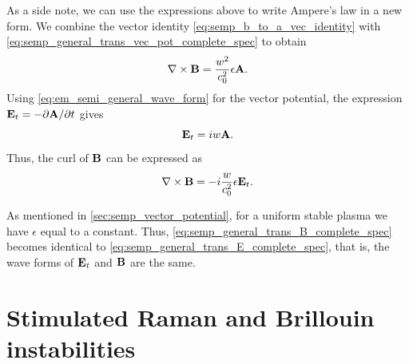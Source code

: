 \documentclass[a4paper,11pt]{report}
\begin{document}
As a side note, we can use the expressions above to write Ampere's law in a new form. We combine the vector identity \cref{eq:semp_b_to_a_vec_identity} with \cref{eq:semp_general_trans_vec_pot_complete_spec} to obtain
\begin{equation*}
    \nabla \times \mathbf{B} = \frac{w^2}{c_0^2} \epsilon \mathbf{A}.
\end{equation*}
Using \cref{eq:em_semi_general_wave_form} for the vector potential, the expression $\mathbf{E}_t = -\partial \mathbf{A} / \partial t$ gives
\begin{equation*}
    \mathbf{E}_t = iw \mathbf{A}.
\end{equation*}
Thus, the curl of $\mathbf{B}$ can be expressed as
\begin{equation}
    \nabla \times \mathbf{B} = -i \frac{w}{c_0^2} \epsilon \mathbf{E}_t.
\end{equation}

As mentioned in \cref{sec:semp_vector_potential}, for a uniform stable plasma we have $\epsilon$ equal to a constant. Thus, \cref{eq:semp_general_trans_B_complete_spec} becomes identical to \cref{eq:semp_general_trans_E_complete_spec}, that is, the wave forms of $\mathbf{E}_t$ and $\mathbf{B}$ are the same. 

\chapter{Stimulated Raman and Brillouin instabilities}

\end{document}
